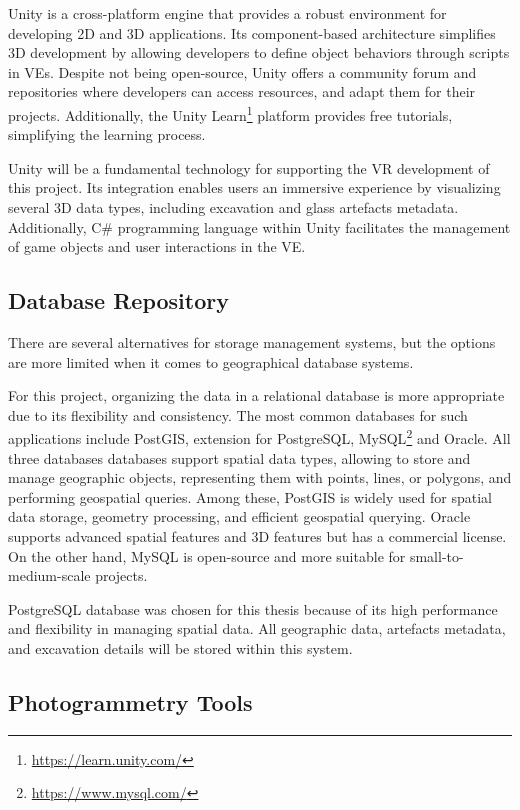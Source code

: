 Unity is a cross-platform engine that provides a robust environment for developing \gls{2D} and \gls{3D} applications. 
Its component-based architecture simplifies \gls{3D} development by allowing developers to define object behaviors through scripts in \glspl{VE}.
Despite not being open-source, Unity offers a community forum and repositories where developers can access resources, and adapt them for their projects.
Additionally, the Unity Learn\footnote{\url{https://learn.unity.com/}} platform provides free tutorials, simplifying the learning process.

Unity will be a fundamental technology for supporting the \gls{VR} development of this project. Its integration enables users an immersive experience by visualizing several \gls{3D} data types, including excavation and glass artefacts metadata. 
Additionally, C\# programming language within Unity facilitates the management of game objects and user interactions in the \gls{VE}.


\subsection{Database Repository}
\label{sec:repos}

There are several alternatives for storage management systems, but the options are more limited when it comes to geographical
database systems.

For this project, organizing the data in a relational database is more appropriate due to its flexibility and consistency.
The most common databases for such applications include PostGIS, extension for PostgreSQL, MySQL\footnote{\url{https://www.mysql.com/}} and Oracle.
All three databases databases support spatial data types, allowing to store and manage geographic objects, representing them with points, lines, or polygons, and performing geospatial queries.
Among these, PostGIS is widely used for spatial data storage, geometry processing, and efficient geospatial querying.
Oracle supports advanced spatial features and 3D features but has a commercial license. On the other hand, MySQL is open-source and more suitable for small-to-medium-scale projects.

PostgreSQL database was chosen for this thesis because of its high performance and flexibility in managing spatial data. All geographic data, artefacts metadata, and excavation details will be stored within this system.


\subsection{Photogrammetry Tools}
\label{sec:photogrammetry_tool} 

